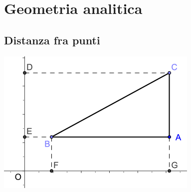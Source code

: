 \chapter{Geometria analitica}
\label{cha:geometriaanalitcabase}
\minitoc
\mtcskip                                %
\minilof                                %
\mtcskip                                %
\minilot
\section{Distanza fra punti}
\label{sec:Distanzafrapunti}
\includegraphics{GeoAnaliticaDIstPuntiPitag}
